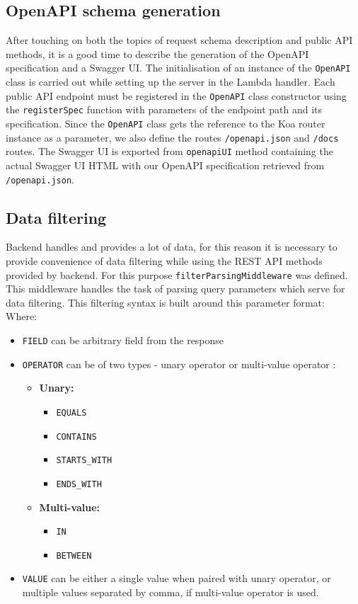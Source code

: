 \subsection{OpenAPI schema generation}
After touching on both the topics of request schema description and public API methods, it is a good time to describe the generation of the OpenAPI specification and a Swagger UI. 
The initialisation of an instance of the \texttt{OpenAPI} class is carried out while setting up the server in the Lambda handler.
Each public API endpoint must be registered in the \texttt{OpenAPI} class constructor using the \texttt{registerSpec} function with parameters of the endpoint path and its specification. 
Since the \texttt{OpenAPI} class gets the reference to the Koa router instance as a parameter, we also define the routes \texttt{/openapi.json} and \texttt{/docs} routes.
The Swagger UI is exported from \texttt{openapiUI} method containing the actual Swagger UI HTML with our OpenAPI specification retrieved from \texttt{/openapi.json}.


\subsection{Data filtering}
Backend handles and provides a lot of data, for this reason it is necessary to provide convenience of data filtering while using the REST API methods provided by backend.
For this purpose \texttt{filterParsingMiddleware} was defined.
This middleware handles the task of parsing query parameters which serve for data filtering.
This filtering syntax is built around this parameter format: 
\\ Where: 
\begin{itemize}
    \item \texttt{FIELD} can be arbitrary field from the response
    \item \texttt{OPERATOR} can be of two types - unary operator or multi-value operator :
    \begin{itemize}
        \item \textbf{Unary:}
        \begin{itemize}
            \item \texttt{EQUALS}
            \item \texttt{CONTAINS}
            \item \texttt{STARTS\_WITH}
            \item \texttt{ENDS\_WITH}
        \end{itemize}
        \item \textbf{Multi-value:}
        \begin{itemize}
            \item \texttt{IN} 
            \item \texttt{BETWEEN}
        \end{itemize}
    \end{itemize}
    \item \texttt{VALUE} can be either a single value when paired with unary operator, or multiple values separated by comma, if multi-value operator is used.
\end{itemize}

